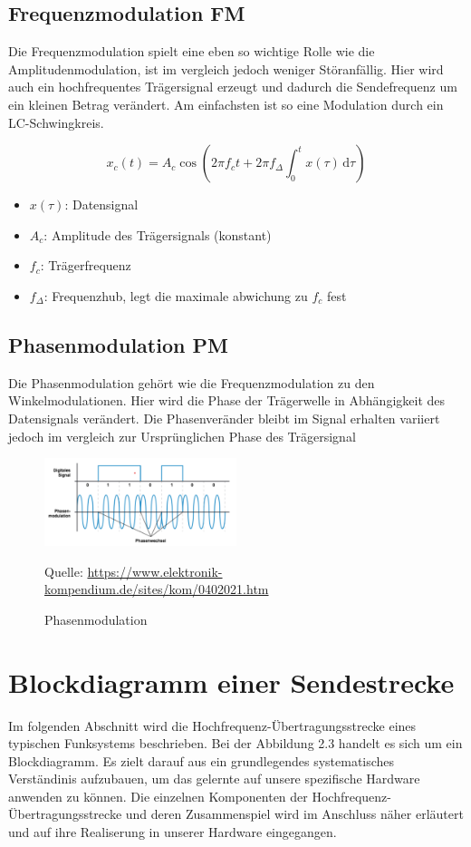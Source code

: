 \subsection{Frequenzmodulation FM}
Die Frequenzmodulation spielt eine eben so wichtige Rolle wie die Amplitudenmodulation,
ist im vergleich jedoch weniger Störanfällig. 
Hier wird auch ein hochfrequentes Trägersignal erzeugt und dadurch die Sendefrequenz um ein kleinen Betrag verändert.
Am einfachsten ist so eine Modulation durch ein LC-Schwingkreis.

\begin{equation}
x_c(t) = A_c \cos\left( 2\pi f_c t + 2\pi f_\Delta \int_0^t x(\tau) \, \mathrm{d}\tau \right)
\end{equation}
\begin{itemize}
    \item $x(\tau)$: Datensignal
    \item $A_c$: Amplitude des Trägersignals (konstant)
    \item $f_c$: Trägerfrequenz 
    \item $f_\Delta$: Frequenzhub, legt die maximale abwichung zu $f_c$ fest
\end{itemize}
\clearpage

\subsection{Phasenmodulation PM}
Die Phasenmodulation gehört wie die Frequenzmodulation zu den Winkelmodulationen.
Hier wird die Phase der Trägerwelle in Abhängigkeit des Datensignals verändert.
Die Phasenveränder bleibt im Signal erhalten variiert jedoch im vergleich
zur Ursprünglichen Phase des Trägersignal
\begin{figure}[h]
    \centering
    \includegraphics[width=0.5\textwidth]{Pictures/04020211.png}
    \caption{Phasenmodulation}
    \footnotesize{Quelle: \url{https://www.elektronik-kompendium.de/sites/kom/0402021.htm}}
\end{figure}

\section{Blockdiagramm einer Sendestrecke}
Im folgenden Abschnitt wird die Hochfrequenz-Übertragungsstrecke eines typischen Funksystems beschrieben. Bei der Abbildung 2.3 handelt es sich um ein Blockdiagramm. Es zielt darauf aus ein grundlegendes
systematisches Verständinis aufzubauen, um das gelernte auf unsere spezifische Hardware anwenden zu können. Die einzelnen Komponenten der Hochfrequenz-Übertragungsstrecke 
und deren Zusammenspiel wird im Anschluss näher erläutert und auf ihre Realiserung in unserer Hardware eingegangen.\\

